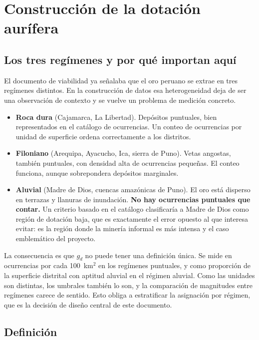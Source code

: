 \documentclass[11pt,a4paper]{article}
\begin{document}
\section{Construcción de la dotación aurífera}

\subsection{Los tres regímenes y por qué importan aquí}

El documento de viabilidad ya señalaba que el oro peruano se extrae en tres regímenes distintos. En la construcción de datos esa heterogeneidad deja de ser una observación de contexto y se vuelve un problema de medición concreto.

\begin{itemize}[leftmargin=1.6em,itemsep=3pt]
\item \textbf{Roca dura} (Cajamarca, La Libertad). Depósitos puntuales, bien representados en el catálogo de ocurrencias. Un conteo de ocurrencias por unidad de superficie ordena correctamente a los distritos.
\item \textbf{Filoniano} (Arequipa, Ayacucho, Ica, sierra de Puno). Vetas angostas, también puntuales, con densidad alta de ocurrencias pequeñas. El conteo funciona, aunque sobrepondera depósitos marginales.
\item \textbf{Aluvial} (Madre de Dios, cuencas amazónicas de Puno). El oro está disperso en terrazas y llanuras de inundación. \textbf{No hay ocurrencias puntuales que contar.} Un criterio basado en el catálogo clasificaría a Madre de Dios como región de dotación baja, que es exactamente el error opuesto al que interesa evitar: es la región donde la minería informal es más intensa y el caso emblemático del proyecto.
\end{itemize}

La consecuencia es que $g_d$ no puede tener una definición única. Se mide en ocurrencias por cada 100~km$^2$ en los regímenes puntuales, y como proporción de la superficie distrital con aptitud aluvial en el régimen aluvial. Como las unidades son distintas, los umbrales también lo son, y la comparación de magnitudes entre regímenes carece de sentido. Esto obliga a estratificar la asignación por régimen, que es la decisión de diseño central de este documento.

\subsection{Definición}
\end{document}
